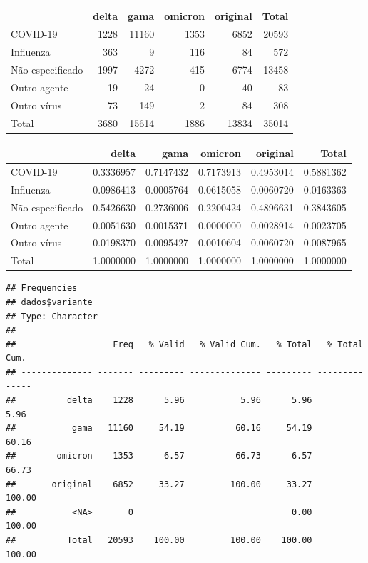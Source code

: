 \documentclass[
]{article}
\newenvironment{Shaded}{\begin{snugshade}}{\end{snugshade}}
\newcommand{\FunctionTok}[1]{\textcolor[rgb]{0.00,0.00,0.00}{#1}}
\newcommand{\NormalTok}[1]{#1}
\newcommand{\OtherTok}[1]{\textcolor[rgb]{0.56,0.35,0.01}{#1}}
\newcommand{\SpecialCharTok}[1]{\textcolor[rgb]{0.00,0.00,0.00}{#1}}
\newcommand{\StringTok}[1]{\textcolor[rgb]{0.31,0.60,0.02}{#1}}
\begin{document}
\begin{table}

\centering
\begin{tabular}[t]{l|r|r|r|r|r}
\hline
  & delta & gama & omicron & original & Total\\
\hline
COVID-19 & 1228 & 11160 & 1353 & 6852 & 20593\\
\hline
Influenza & 363 & 9 & 116 & 84 & 572\\
\hline
Não especificado & 1997 & 4272 & 415 & 6774 & 13458\\
\hline
Outro agente & 19 & 24 & 0 & 40 & 83\\
\hline
Outro vírus & 73 & 149 & 2 & 84 & 308\\
\hline
Total & 3680 & 15614 & 1886 & 13834 & 35014\\
\hline
\end{tabular}
\centering
\begin{tabular}[t]{l|r|r|r|r|r}
\hline
  & delta & gama & omicron & original & Total\\
\hline
COVID-19 & 0.3336957 & 0.7147432 & 0.7173913 & 0.4953014 & 0.5881362\\
\hline
Influenza & 0.0986413 & 0.0005764 & 0.0615058 & 0.0060720 & 0.0163363\\
\hline
Não especificado & 0.5426630 & 0.2736006 & 0.2200424 & 0.4896631 & 0.3843605\\
\hline
Outro agente & 0.0051630 & 0.0015371 & 0.0000000 & 0.0028914 & 0.0023705\\
\hline
Outro vírus & 0.0198370 & 0.0095427 & 0.0010604 & 0.0060720 & 0.0087965\\
\hline
Total & 1.0000000 & 1.0000000 & 1.0000000 & 1.0000000 & 1.0000000\\
\hline
\end{tabular}
\end{table}

\begin{Shaded}
\end{Shaded}

\begin{verbatim}
## Frequencies  
## dados$variante  
## Type: Character  
## 
##                   Freq   % Valid   % Valid Cum.   % Total   % Total Cum.
## -------------- ------- --------- -------------- --------- --------------
##          delta    1228      5.96           5.96      5.96           5.96
##           gama   11160     54.19          60.16     54.19          60.16
##        omicron    1353      6.57          66.73      6.57          66.73
##       original    6852     33.27         100.00     33.27         100.00
##           <NA>       0                               0.00         100.00
##          Total   20593    100.00         100.00    100.00         100.00
\end{verbatim}
\end{document}
